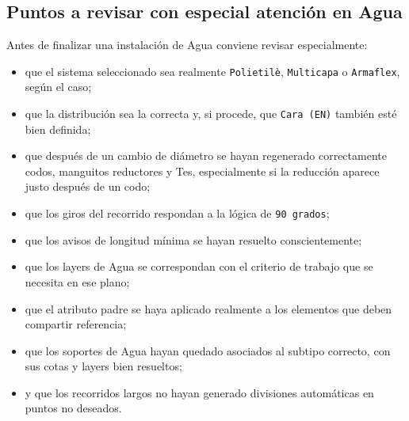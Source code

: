 \subsection{Puntos a revisar con especial atención en Agua}

Antes de finalizar una instalación de Agua conviene revisar especialmente:

\begin{itemize}
\item que el sistema seleccionado sea realmente \texttt{Polietilè}, \texttt{Multicapa} o \texttt{Armaflex}, según el caso;
\item que la distribución sea la correcta y, si procede, que \texttt{Cara (EN)} también esté bien definida;
\item que después de un cambio de diámetro se hayan regenerado correctamente codos, manguitos reductores y Tes, especialmente si la reducción aparece justo después de un codo;
\item que los giros del recorrido respondan a la lógica de \texttt{90 grados};
\item que los avisos de longitud mínima se hayan resuelto conscientemente;
\item que los layers de Agua se correspondan con el criterio de trabajo que se necesita en ese plano;
\item que el atributo padre se haya aplicado realmente a los elementos que deben compartir referencia;
\item que los soportes de Agua hayan quedado asociados al subtipo correcto, con sus cotas y layers bien resueltos;
\item y que los recorridos largos no hayan generado divisiones automáticas en puntos no deseados.
\end{itemize}

